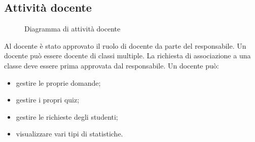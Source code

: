 \documentclass[a4paper, titlepage]{article}
\begin{document}
\subsection{Attività docente}
\begin{figure}[H]
	\centering
	\noindent{}
	\caption{Diagramma di attività docente}
\end{figure}
Al docente è stato approvato il ruolo di docente da parte del responsabile. Un docente può essere docente di classi multiple. La richiesta di associazione a una classe deve essere prima approvata dal responsabile. 
Un docente può:
\begin{itemize}
	\item gestire le proprie domande;
	\item gestire i propri quiz;
	\item gestire le richieste degli studenti;
	\item visualizzare vari tipi di statistiche.
\end{itemize}

\newpage
\end{document}
